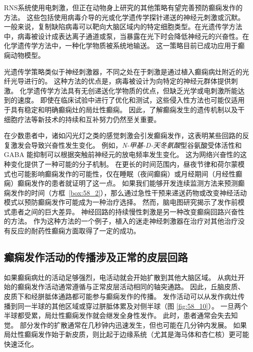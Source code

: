 \begin{proposition}[实时检测和预防癫痫的新方法]
	\quad \quad RNS系统使用电刺激，但正在动物身上研究的其他策略有望完善预防癫痫发作的方法。
	这些包括使用病毒介导的光或化学遗传学探针递送的神经元刺激或沉默。
	一般来说，复制缺陷病毒可以靶向大脑区域内的特定细胞类型。在光遗传学方法中，病毒被设计成表达离子通道或泵，当暴露在光下时会降低神经元的兴奋性。在化学遗传学方法中，一种化学物质被系统地输送。
	这一策略目前已成功应用于癫痫动物模型。
	
	\quad \quad 光遗传学策略类似于神经刺激器，不同之处在于刺激是通过植入癫痫病灶附近的光纤光导进行的。
	这种方法的优点是，病毒被设计为向特定的神经元群体提供刺激。
	化学遗传学方法具有无创递送化学物质的优点，但缺乏光学或电刺激所能达到的速度。
	即使在临床试验中进行了优化和测试，这些侵入性方法也可能仅适用于具有稳定和明确癫痫灶的局灶性癫痫。
	因此，了解癫痫发生的遗传机制以及干细胞疗法等新技术的持续和互补努力仍然至关重要。
	
\end{proposition}


在少数患者中，诸如闪光灯之类的感觉刺激会引发癫痫发作，这表明某些回路的反复激发会导致兴奋性发生变化。
例如，\textit{N-甲基-D-天冬氨酸}型谷氨酸受体活性和 GABA 能抑制可以根据突触前神经元的放电频率发生变化。
这为网络兴奋性的这种变化提供了一种可能的分子机制。
在更长的时间范围内，昼夜节律和荷尔蒙模式也可能影响癫痫发作的可能性，仅在睡眠（夜间癫痫）或月经期间（月经性癫痫）癫痫发作的患者就证明了这一点。
如果我们能够开发连续监测方法来预测癫痫发作的时间（方框~\ref{box:58_2}），那么通过急性干预来递送药物或改变神经活动模式以预防癫痫发作可能成为一种治疗选择。
然而，脑电图研究揭示了发作前模式患者之间的巨大差异。
神经回路的持续慢性刺激是另一种改变癫痫回路兴奋性的方法。
作为这种方法的一个例子，植入的迷走神经刺激器在治疗对其他治疗没有反应的耐药性癫痫方面取得了一定的成功。



\subsection{癫痫发作活动的传播涉及正常的皮层回路}

如果癫痫病灶的活动足够强烈，电活动就会开始扩散到其他大脑区域。
从病灶开始的癫痫发作活动通常遵循与正常皮层活动相同的轴突通路。
因此，丘脑皮质、皮质下和经胼胝体通路都可能参与癫痫发作的传播。
发作活动可以从发作病灶传播到同一半球的其他区域或穿过胼胝体累及对侧半球（图 \ref{fig:58_10}）。
一旦两个半球都受累，局灶性癫痫发作就会继发全身性发作。
此时，患者通常会失去知觉。
部分发作的扩散通常在几秒钟内迅速发生，但也可能在几分钟内发展。
如果局灶性癫痫发作始于新皮质，则比起于边缘系统（尤其是海马体和杏仁核）更可能快速泛化。


